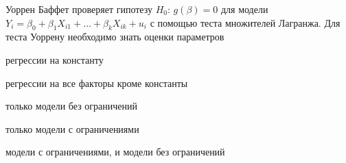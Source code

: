 
\begin{question}
Уоррен Баффет проверяет гипотезу \(H_0\): \(g(\beta)=0\) для модели
\(Y_i = \beta_0 + \beta_1 X_{i1} + \ldots + \beta_k X_{ik} + u_i\) с помощью теста множителей Лагранжа.
Для теста Уоррену необходимо знать оценки параметров
\begin{answerlist}
  \item регрессии на константу
  \item регрессии на все факторы кроме константы
  \item только модели без ограничений
  \item только модели с ограничениями
  \item модели с ограничениями, и модели без ограничений
\end{answerlist}
\end{question}



